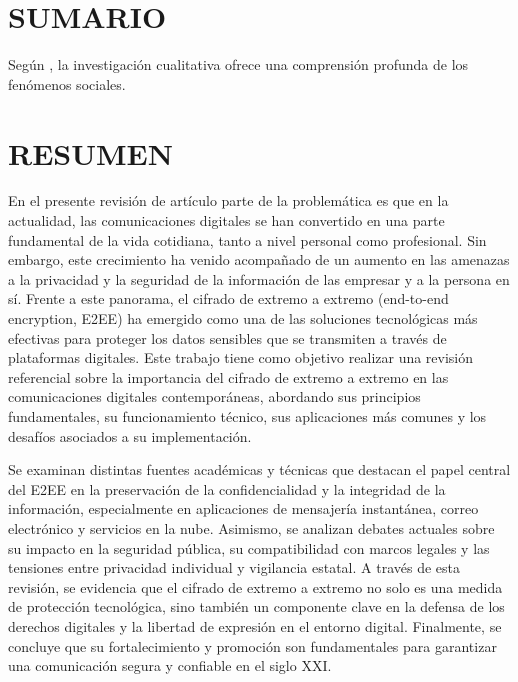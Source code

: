 \documentclass[spanish,12pt,a4paper]{article}
\begin{document}
	\begin{multicols}{2}
		
		
		\section*{\normalsize SUMARIO}
	
		Según \parencite{perez2020}, la investigación cualitativa ofrece una comprensión profunda de los fenómenos sociales.
		
		\section*{\normalsize RESUMEN}
		En el presente revisión de artículo parte de la problemática es que en la actualidad, las comunicaciones digitales se han convertido en una parte fundamental de la vida cotidiana, tanto a nivel personal como profesional. Sin embargo, este crecimiento ha venido acompañado de un aumento en las amenazas a la privacidad y la seguridad de la información de las empresar y a la persona en sí. Frente a este panorama, el cifrado de extremo a extremo (end-to-end encryption, E2EE) ha emergido como una de las soluciones tecnológicas más efectivas para proteger los datos sensibles que se transmiten a través de plataformas digitales. Este trabajo tiene como objetivo realizar una revisión referencial sobre la importancia del cifrado de extremo a extremo en las comunicaciones digitales contemporáneas, abordando sus principios fundamentales, su funcionamiento técnico, sus aplicaciones más comunes y los desafíos asociados a su implementación.
		
		Se examinan distintas fuentes académicas  y técnicas que destacan el papel central del E2EE en la preservación de la confidencialidad y la integridad de la información, especialmente en aplicaciones de mensajería instantánea, correo electrónico y servicios en la nube. Asimismo, se analizan debates actuales sobre su impacto en la seguridad pública, su compatibilidad con marcos legales y las tensiones entre privacidad individual y vigilancia estatal. A través de esta revisión, se evidencia que el cifrado de extremo a extremo no solo es una medida de protección tecnológica, sino también un componente clave en la defensa de los derechos digitales y la libertad de expresión en el entorno digital. Finalmente, se concluye que su fortalecimiento y promoción son fundamentales para garantizar una comunicación segura y confiable en el siglo XXI.
		

\end{multicols}
\end{document}
